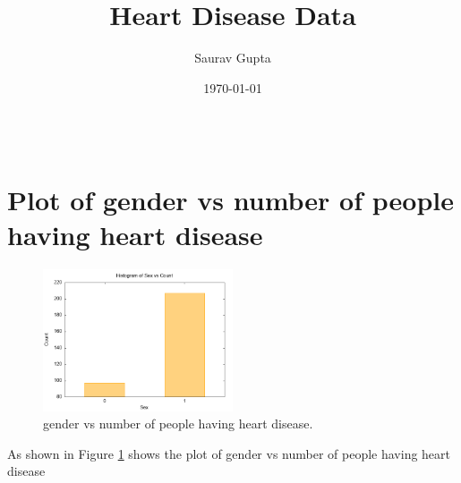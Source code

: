 \documentclass{article}
\title{Heart Disease Data}
\author{Saurav Gupta}
\date{\today}
\begin{document}
\maketitle
\begin{longtable}{
|
c|}
\hline
 \\
\hline
\endfirsthead
\hline
\end{longtable}
\section{Plot of gender vs number of people having heart disease}
\begin{figure}[h!]
\centering
\includegraphics[width=0.5\textwidth]{plot-4a.png}
\caption{gender vs number of people having heart disease.}
\label{fig:image1}
\end{figure}
As shown in Figure \ref{fig:image1} shows the plot of gender vs number of people having heart disease
\end{document}
